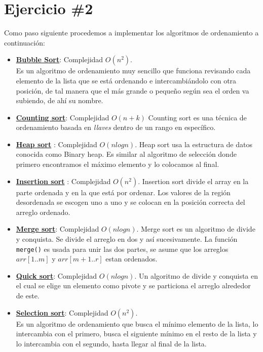 \section*{Ejercicio \#2}
Como paso siguiente procedemos a implementar los algoritmos de ordenamiento a continuación:
\begin{itemize}
    \item \href{https://github.com/syordya/CSUNSA-EDA/tree/master/Practica01/code/BubbleSort}{\textbf{Bubble Sort}}: Complejidad $O(n^2)$.\\
    Es  un  algoritmo  de  ordenamiento  muy  sencillo  que  funciona  revisando  cada elemento de la lista que se está ordenando e intercambiándolo con otra posición, de tal manera que el más grande o pequeño según sea el orden va subiendo, de ahí su nombre.\cite{marisolanalisis}
    \item \href{https://github.com/syordya/CSUNSA-EDA/tree/master/Practica01/code/CountingSort}{\textbf{Counting sort}}: Complejidad $O(n+k)$
    Counting sort es una técnica de ordenamiento basada en \textit{llaves} dentro de un rango en específico.
    \item \href{https://github.com/syordya/CSUNSA-EDA/tree/master/Practica01/code/HeapSort}{\textbf{Heap sort}} : Complejidad $O(nlogn)$.
    Heap sort usa la estructura de datos conocida como Binary heap. Es similar al algoritmo de selección donde primero encontramos el máximo elemento y lo colocamos al final.
    \item \href{https://github.com/syordya/CSUNSA-EDA/tree/master/Practica01/code/InsertionSort}{\textbf{Insertion sort}} : Complejidad $O(n^2)$.
    Insertion sort divide el array en la parte ordenada y en la que está por ordenar. Los valores de la región desordenada se escogen uno a uno y se colocan en la posición correcta del arreglo ordenado. \cite{cormen}
    \item \href{https://github.com/syordya/CSUNSA-EDA/tree/master/Practica01/code/MergeSort}{\textbf{Merge sort}}: Complejidad $O(n log n)$.
    Merge sort es un algoritmo de divide y conquista. Se divide el arreglo en dos y así sucesivamente. La función \verb!merge()! es usada para unir las dos partes, se asume que los arreglos \(arr[1..m]\) y \(arr[m+1..r]\)  estan ordenados.
    \item \href{https://github.com/syordya/CSUNSA-EDA/tree/master/Practica01/code/QuickSort}{\textbf{Quick sort}}: Complejidad $O(nlogn)$.
    Un algoritmo de divide y conquista en el cual se elige un elemento como pivote y se particiona el arreglo alrededor de este.
    \item \href{https://github.com/syordya/CSUNSA-EDA/tree/master/Practica01/code/SelectionSort}{\textbf{Selection sort}}: Complejidad $O(n^2)$.\\
    Es un algoritmo  de  ordenamiento que  busca el  mínimo elemento  de  la  lista,  lo intercambia con el primero, busca el siguiente mínimo en el resto de la lista y lo intercambia con el segundo, hasta llegar al final de la lista.\cite{marisolanalisis}
\end{itemize}

